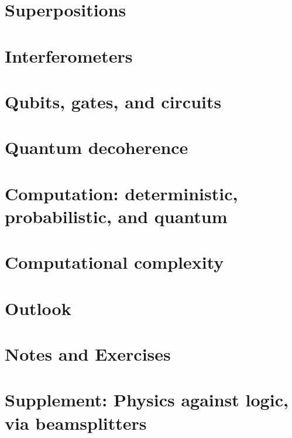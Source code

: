 \documentclass[
]{book}
\theoremstyle{definition}
\theoremstyle{definition}
\theoremstyle{definition}
\theoremstyle{remark}
\begin{document}
\hypertarget{superpositions}{%
\section{Superpositions}\label{superpositions}}

\hypertarget{interferometers}{%
\section{Interferometers}\label{interferometers}}

\hypertarget{qubits-gates-and-circuits}{%
\section{Qubits, gates, and circuits}\label{qubits-gates-and-circuits}}

\hypertarget{quantum-decoherence}{%
\section{Quantum decoherence}\label{quantum-decoherence}}

\hypertarget{computation-deterministic-probabilistic-and-quantum}{%
\section{Computation: deterministic, probabilistic, and quantum}\label{computation-deterministic-probabilistic-and-quantum}}

\hypertarget{computational-complexity}{%
\section{Computational complexity}\label{computational-complexity}}

\hypertarget{outlook}{%
\section{Outlook}\label{outlook}}

\hypertarget{notes-and-exercises}{%
\section{Notes and Exercises}\label{notes-and-exercises}}

\hypertarget{supplement-physics-against-logic-via-beamsplitters}{%
\section{Supplement: Physics against logic, via beamsplitters}\label{supplement-physics-against-logic-via-beamsplitters}}
\end{document}

